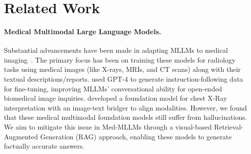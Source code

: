\section{Related Work}


\paragraph{Medical Multimodal Large Language Models.}
Substantial advancements have been made in adapting MLLMs to medical imaging~\cite{Zhang2023PMCVQAVI, Wu2023TowardsGF, Moor2023MedFlamingoAM,Lee2023LLMCXRIL}. The primary focus has been on training these models for radiology tasks using medical images (like X-rays, MRIs, and CT scans) along with their textual descriptions/reports.
\citet{Li2023LLaVAMedTA} used GPT-4 to generate instruction-following data for fine-tuning, improving MLLMs' conversational ability for open-ended biomedical image inquiries.
\citet{Chen2024CheXagentTA} developed a foundation model for chest X-Ray interpretation with an image-text bridger to align modalities.
However, we found that these medical multimodal foundation models still suffer from hallucinations.
We aim to mitigate this issue in Med-MLLMs through a visual-based Retrieval-Augmented Generation (RAG) approach, enabling these models to generate factually accurate answers.



